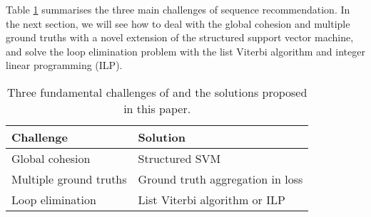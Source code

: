 Table \ref{tbl:challenges} summarises the three main challenges of sequence recommendation.
In the next section, we will see how to deal with the global cohesion and multiple ground truths with a novel extension of 
the structured support vector machine,
and solve the loop elimination problem with the list Viterbi algorithm and integer linear programming (ILP). 

\begin{table}[!h]
	\centering
	\begin{tabular}{ll}
	\hline
	\hline
	{\bf Challenge}                    & {\bf Solution}                             \\ \hline
	Global cohesion                    & Structured SVM                             \\ \hline
	Multiple ground truths             & Ground truth aggregation in loss 			\\ \hline
	Loop elimination                   & List Viterbi algorithm or ILP              \\ \hline  
	\end{tabular}
	\caption{Three fundamental challenges of {\seqrec} and the solutions proposed in this paper.}
	\label{tbl:challenges}
\end{table}
